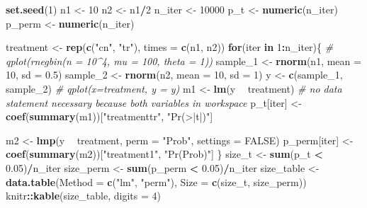 \documentclass[]{book}
\newenvironment{Shaded}{\begin{snugshade}}{\end{snugshade}}
\newcommand{\CommentTok}[1]{\textcolor[rgb]{0.56,0.35,0.01}{\textit{#1}}}
\newcommand{\ControlFlowTok}[1]{\textcolor[rgb]{0.13,0.29,0.53}{\textbf{#1}}}
\newcommand{\DataTypeTok}[1]{\textcolor[rgb]{0.13,0.29,0.53}{#1}}
\newcommand{\DecValTok}[1]{\textcolor[rgb]{0.00,0.00,0.81}{#1}}
\newcommand{\FloatTok}[1]{\textcolor[rgb]{0.00,0.00,0.81}{#1}}
\newcommand{\KeywordTok}[1]{\textcolor[rgb]{0.13,0.29,0.53}{\textbf{#1}}}
\newcommand{\NormalTok}[1]{#1}
\newcommand{\OperatorTok}[1]{\textcolor[rgb]{0.81,0.36,0.00}{\textbf{#1}}}
\newcommand{\OtherTok}[1]{\textcolor[rgb]{0.56,0.35,0.01}{#1}}
\newcommand{\StringTok}[1]{\textcolor[rgb]{0.31,0.60,0.02}{#1}}
\begin{document}
\begin{Shaded}
\begin{Highlighting}[]
\KeywordTok{set.seed}\NormalTok{(}\DecValTok{1}\NormalTok{)}
\NormalTok{n1 <-}\StringTok{ }\DecValTok{10}
\NormalTok{n2 <-}\StringTok{ }\NormalTok{n1}\OperatorTok{/}\DecValTok{2}
\NormalTok{n_iter <-}\StringTok{ }\DecValTok{10000}
\NormalTok{p_t <-}\StringTok{ }\KeywordTok{numeric}\NormalTok{(n_iter)}
\NormalTok{p_perm <-}\StringTok{ }\KeywordTok{numeric}\NormalTok{(n_iter)}

\NormalTok{treatment <-}\StringTok{ }\KeywordTok{rep}\NormalTok{(}\KeywordTok{c}\NormalTok{(}\StringTok{"cn"}\NormalTok{, }\StringTok{"tr"}\NormalTok{), }\DataTypeTok{times =} \KeywordTok{c}\NormalTok{(n1, n2))}
\ControlFlowTok{for}\NormalTok{(iter }\ControlFlowTok{in} \DecValTok{1}\OperatorTok{:}\NormalTok{n_iter)\{}
  \CommentTok{#  qplot(rnegbin(n = 10^4, mu = 100, theta = 1))}
\NormalTok{  sample_}\DecValTok{1}\NormalTok{ <-}\StringTok{ }\KeywordTok{rnorm}\NormalTok{(n1, }\DataTypeTok{mean =} \DecValTok{10}\NormalTok{, }\DataTypeTok{sd =} \FloatTok{0.5}\NormalTok{)}
\NormalTok{  sample_}\DecValTok{2}\NormalTok{ <-}\StringTok{ }\KeywordTok{rnorm}\NormalTok{(n2, }\DataTypeTok{mean =} \DecValTok{10}\NormalTok{, }\DataTypeTok{sd =} \DecValTok{1}\NormalTok{)}
\NormalTok{  y <-}\StringTok{ }\KeywordTok{c}\NormalTok{(sample_}\DecValTok{1}\NormalTok{, sample_}\DecValTok{2}\NormalTok{)}
  \CommentTok{# qplot(x=treatment, y = y)}
\NormalTok{  m1 <-}\StringTok{ }\KeywordTok{lm}\NormalTok{(y }\OperatorTok{~}\StringTok{ }\NormalTok{treatment) }\CommentTok{# no data statement necessary because both variables in workspace}
\NormalTok{  p_t[iter] <-}\StringTok{ }\KeywordTok{coef}\NormalTok{(}\KeywordTok{summary}\NormalTok{(m1))[}\StringTok{"treatmenttr"}\NormalTok{, }\StringTok{"Pr(>|t|)"}\NormalTok{]}
  
\NormalTok{  m2 <-}\StringTok{ }\KeywordTok{lmp}\NormalTok{(y }\OperatorTok{~}\StringTok{ }\NormalTok{treatment,}
            \DataTypeTok{perm =} \StringTok{"Prob"}\NormalTok{,}
            \DataTypeTok{settings =} \OtherTok{FALSE}\NormalTok{)}
\NormalTok{  p_perm[iter] <-}\StringTok{ }\KeywordTok{coef}\NormalTok{(}\KeywordTok{summary}\NormalTok{(m2))[}\StringTok{"treatment1"}\NormalTok{, }\StringTok{"Pr(Prob)"}\NormalTok{]}
\NormalTok{\}}
\NormalTok{size_t <-}\StringTok{ }\KeywordTok{sum}\NormalTok{(p_t }\OperatorTok{<}\StringTok{ }\FloatTok{0.05}\NormalTok{)}\OperatorTok{/}\NormalTok{n_iter}
\NormalTok{size_perm <-}\StringTok{ }\KeywordTok{sum}\NormalTok{(p_perm }\OperatorTok{<}\StringTok{ }\FloatTok{0.05}\NormalTok{)}\OperatorTok{/}\NormalTok{n_iter}
\NormalTok{size_table <-}\StringTok{ }\KeywordTok{data.table}\NormalTok{(}\DataTypeTok{Method =} \KeywordTok{c}\NormalTok{(}\StringTok{"lm"}\NormalTok{, }\StringTok{"perm"}\NormalTok{),}
                         \DataTypeTok{Size =} \KeywordTok{c}\NormalTok{(size_t, size_perm))}
\NormalTok{knitr}\OperatorTok{::}\KeywordTok{kable}\NormalTok{(size_table, }\DataTypeTok{digits =} \DecValTok{4}\NormalTok{)}
\end{Highlighting}
\end{Shaded}
\end{document}
